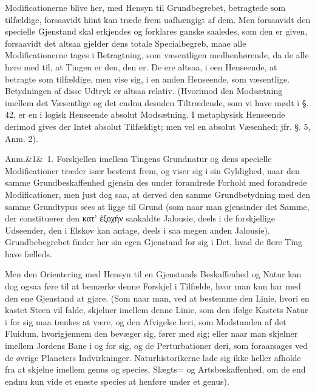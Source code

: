 \documentclass[12pt]{book}
\makeatletter
\def\sperr#1{#1}%
\def\textit#1{#1}%
\def\emph#1{#1}%
\newcommand{\sperr}[1]{\textls[180]{#1}}
\newcommand{\umph}[2][misc]{%
  \@ifundefined{umph@#1@on}{#2}{\emph{#2}}}
\newcommand{\anm}[1]{%
  \par\vspace{0.5\baselineskip}%
  \noindent\hspace{\parindent}\sperr{Anm.}\ifx&#1&\else~\textit{#1}.\fi
  \enspace\ignorespaces
}
\newcommand{\opage}[1]{\marginnote{\footnotesize\textit{[#1]}}}
\makeatother
\begin{document}
Modificationerne blive her, med Hensyn til Grundbegrebet, betragtede som tilfældige,
forsaavidt hiint kan træde frem uafhængigt af dem. Men forsaavidt den specielle Gjenstand
skal erkjendes og forklares ganske saaledes, som den er given, forsaavidt det altsaa
gjelder dens totale Specialbegreb, maae alle Modificationerne tages i Betragtning, som
væsentligen medhenhørende, da de alle høre med til, at Tingen er den, den er. De ere
altsaa, i een Henseende, at betragte som tilfældige, men vise sig, i en anden Henseende,
som væsentlige. Betydningen af disse Udtryk er altsaa relativ. (Hvorimod den Modsætning
imellem det Væsentlige og det endnu desuden Tiltrædende, som vi have mødt i §. 42, er en
i logisk Henseende absolut Modsætning. I metaphysisk Henseende derimod gives der Intet
absolut Tilfældigt; men vel en absolut Væsenhed; jfr. §. 5, Anm. 2).

\anm{1} Forskjellen imellem Tingens Grundnatur og dens specielle Modificationer træder
især bestemt frem, og viser sig i sin Gyldighed, naar den samme Grundbeskaffenhed gjensin%
\opage{124}des under forandrede Forhold med forandrede Modificationer, men just dog saa, at derved
den samme Grundbetydning med den samme Grundtypus sees at ligge til Grund (som naar man
gjensinder det Samme, der constituerer den \textit{κατ' ἐξοχήν} saakaldte Jalousie, deels
i de forskjellige Udseender, den i Elskov kan antage, deels i saa megen anden Jalousie).
Grundbebegrebet finder her sin egen Gjenstand for sig i Det, hvad de flere Ting have
fælleds.

Men den \umph[schwab]{intellectuelle} Orientering med Hensyn til en Gjenstands Beskaffenhed og Natur kan
dog ogsaa føre til at bemærke denne Forskjel i Tilfælde, hvor man kun har med den ene
Gjenstand at gjøre. (Som naar man, ved at bestemme den Linie, hvori en kastet Steen vil
falde, skjelner imellem denne Linie, som den ifølge Kastets Natur i for sig maa tænkes at
være, og den Afvigelse heri, som Modstanden af det Fluidum, hvorigjennem den bevæger sig,
fører med sig; eller naar man skjelner imellem Jordens Bane i og for sig, og de
Perturbationer deri, som foraarsages ved de øvrige Planeters Indvirkninger.
Naturhistorikerne lade sig ikke heller afholde fra at skjelne imellem \textit{genus} og
\textit{species}, Slægts= og Artsbeskaffenhed, om de end endnu kun vide et eneste
\textit{species} at henføre under et \textit{genus}).
\end{document}
